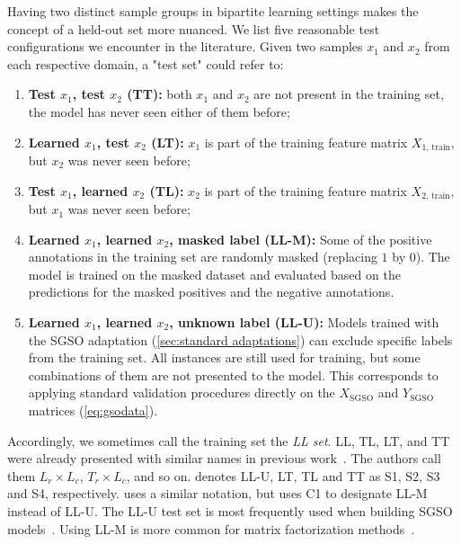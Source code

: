 Having two distinct sample groups in bipartite learning settings makes the concept of a held-out set more nuanced. We list five reasonable test configurations we encounter in the literature. Given two samples $x_1$ and $x_2$ from each respective domain, a "test set" could refer to:
%
\begin{enumerate}
    \item \textbf{Test $x_1$, test $x_2$ (TT):} both $x_1$ and $x_2$ are not present in the training set, the model has never seen either of them before;
    \item \textbf{Learned $x_1$, test $x_2$ (LT):} $x_1$ is part of the training feature matrix $X_{1\text{, train}}$, but $x_2$ was never seen before;
    \item \textbf{Test $x_1$, learned $x_2$ (TL):} $x_2$ is part of the training feature matrix $X_{2\text{, train}}$, but $x_1$ was never seen before;
    \item \textbf{Learned $x_1$, learned $x_2$, masked label (LL-M):}
    Some of the positive annotations in the training set are randomly masked (replacing $1$ by $0$).
    The model is trained on the masked dataset and evaluated based on the predictions for the masked positives and the negative annotations.
    \item \textbf{Learned $x_1$, learned $x_2$, unknown label (LL-U):}
    Models trained with the SGSO adaptation (\autoref{sec:standard adaptations}) can exclude specific labels from the training set. All instances are still used for training, but some combinations of them are not presented to the model.
    This corresponds to applying standard validation procedures directly on the $X_\text{SGSO}$ and $Y_\text{SGSO}$ matrices (\autoref{eq:gsodata}).
\end{enumerate}
%
Accordingly, we sometimes call the training set the \emph{LL set}.
LL, TL, LT, and TT were already presented with similar names in previous work~\cite{schrynemackers2015classifying,pliakos2018global,pliakos2020drugtarget}. %
The authors call them $L_r \times L_c$, $T_r \times L_c$, and so on.
\cite{pahikkala2015more,ezzat2019computational,liu2016neighborhood} denotes LL-U, LT, TL and TT as S1, S2, S3 and S4, respectively.
\cite{liu2016neighborhood} uses a similar notation, but uses C1 to designate LL-M instead of LL-U. %
%
The LL-U test set is most frequently used when building SGSO models~\cite{pahikkala2015more}.
Using LL-M is more common for matrix factorization methods~\cite{liu2016neighborhood,hao2017predicting,li2019dnilmflda}.

